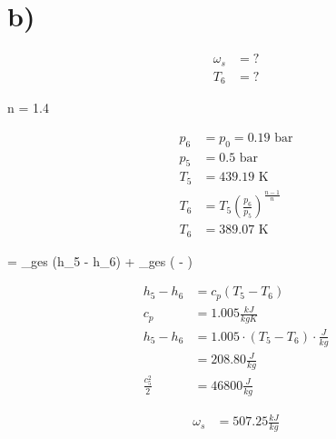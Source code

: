 

\section*{b)}

\begin{align*}
    \omega_s &= ? \\
    T_6 &= ?
\end{align*}

 \quad n = 1.4

\begin{align*}
    p_6 &= p_0 = 0.19 \text{ bar} \\
    p_5 &= 0.5 \text{ bar} \\
    T_5 &= 439.19 \text{ K} \\
    T_6 &= T_5 \left( \frac{p_6}{p_5} \right)^{\frac{n-1}{n}} \\
    T_6 &= 389.07 \text{ K}
\end{align*}

  = _{ges} (h_5 - h_6) + _{ges} \left(  -  \right)

\begin{align*}
    h_5 - h_6 &= c_p (T_5 - T_6) \\
    c_p &= 1.005 \frac{kJ}{kgK} \\
    h_5 - h_6 &= 1.005 \cdot (T_5 - T_6) \cdot \frac{J}{kg} \\
    &= 208.80 \frac{J}{kg} \\
    \frac{c_5^2}{2} &= 46800 \frac{J}{kg}
\end{align*}

\begin{align*}
    \omega_s &= 507.25 \frac{kJ}{kg}
\end{align*}